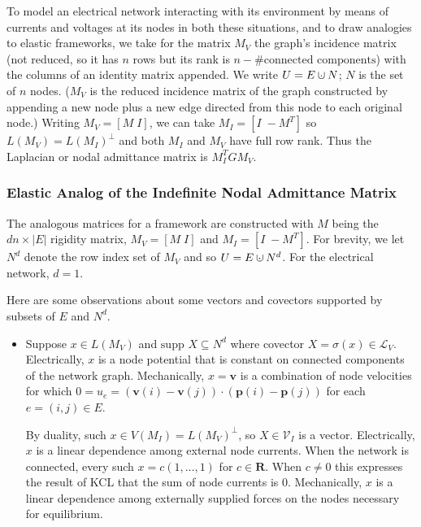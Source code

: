 \documentclass{amsproc-sunycstr}
\def\Reals{\ensuremath{\mathbf R}}
\theoremstyle{plain}
\theoremstyle{definition}
\theoremstyle{remark}
\newcommand{\supp}[1]{{{\mbox{supp\ }#1}}}
\newcommand{\dunion}
{\mbox{\hbox{\hskip4pt$\cdot$\hskip-4.62pt$\cup$\hskip2pt}}}
\newcommand{\hmat}[2]{[#1\;#2]}
\begin{document}
{To model an electrical network interacting with its environment 
by means of currents and voltages at its nodes in both these
situations, and to draw analogies to elastic frameworks, 
we take for the matrix $M_V$ 
the graph's incidence matrix (not reduced, so it has $n$ rows but
its rank is $n-\mbox{\#connected components}$)
with 
the columns of an identity matrix appended.  We write 
$U=E\dunion N$; $N$ is the set of $n$ nodes.
($M_V$ is the reduced incidence matrix of the
graph constructed by appending a new node plus a new edge directed from
this node to each original node.)
Writing 
$M_V=\hmat{M}{I}$, we can take $M_I=\hmat{I}{-M^T}$ so
$L(M_V)=L(M_I)^{\perp}$ and 
both 
$M_I$ and $M_V$ have full row rank.  Thus the Laplacian or nodal admittance
matrix is $M_I^TGM_V$.


\subsubsection{Elastic Analog of the Indefinite Nodal Admittance Matrix}

The analogous matrices for a framework are constructed with $M$ being the
$dn\times |E|$ rigidity matrix,
$M_V=\hmat{M}{I}$ and $M_I=\hmat{I}{-M^T}$.  For brevity, we let
$N^d$ denote the row index set of $M_V$ and so $U=E\dunion N^d$.  For the
electrical network, $d=1$.  



Here are some observations about some vectors
and covectors supported by subsets of $E$ and $N^d$.

\begin{itemize}
\item Suppose $x\in L(M_V)$ and 
$\supp{X}\subseteq N^d$ where covector $X=\sigma(x)\in\mathcal{L}_V$.
Electrically, $x$ is a node potential that is 
constant on connected components of the network graph.  Mechanically,
$x=\mathbf{v}$ is a combination of node velocities for which
$0=u_e=(\mathbf{v}(i)-\mathbf{v}(j))\cdot(\mathbf{p}(i)-\mathbf{p}(j))$
for each $e=(i,j)\in E$.

By duality, such $x\in V(M_I)=L(M_V)^\perp$, so $X\in\mathcal{V}_I$ is a 
vector.  Electrically, $x$ is a linear dependence among external 
node currents.  When the network is connected, every such $x=c(1,\ldots,1)$
for $c\in\Reals$.  When $c\neq 0$ this 
expresses the result of KCL that the sum of node currents is $0$.  
Mechanically, $x$ is a linear dependence among externally supplied
forces on the nodes necessary for equilibrium.


\end{itemize}}
\end{document}
